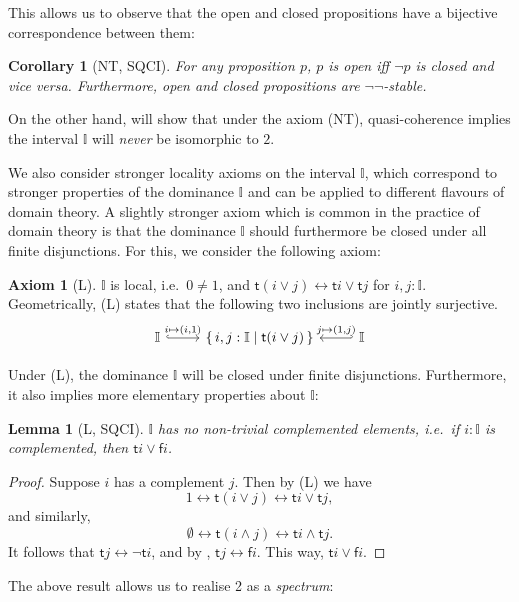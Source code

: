 \documentclass[a4paper,12pt]{amsart}
\newtheorem{lemma}[theorem]{Lemma}
\newtheorem{corollary}[theorem]{Corollary}
\theoremstyle{definition}
\newtheorem*{axiom}{Axiom}
\newcommand{\mbb}[1]{\mathbb{#1}}
\newcommand{\I}{\mbb I}
\newcommand{\ms}[1]{\mathsf{#1}}
\newcommand{\scomp}[2]{\{\,#1\mid#2\,\}}
\newcommand{\dneg}{\neg\neg}
\newcommand{\emp}{\emptyset}
\newcommand{\eq}{\leftrightarrow}
\begin{document}
This allows us to observe that the open and closed propositions have a bijective correspondence between them:

\begin{corollary}[NT, SQCI]\label{cor:opendnegclose}
  For any proposition $p$, $p$ is open iff $\neg p$ is closed and vice versa. Furthermore, open and closed propositions are $\dneg$-stable.
\end{corollary}

On the other hand,  will show that under the axiom (NT), quasi-coherence implies the interval $\I$ will \emph{never} be isomorphic to $2$. 

We also consider stronger locality axioms on the interval $\I$, which correspond to stronger properties of the dominance $\I$ and can be applied to different flavours of domain theory. A slightly stronger axiom which is common in the practice of domain theory is that the dominance $\I$ should furthermore be closed under all finite disjunctions. For this, we consider the following axiom:

\begin{axiom}[L]\label{ax:L}
  $\I$ is local, i.e.\ $0 \neq 1$, and $\ms t(i\vee j) \eq \ms ti \vee \ms tj$ for $i,j : \I$. Geometrically, (L) states that the following two inclusions are jointly surjective.
  \[ 
  \begin{tikzcd}
    \I \ar[r, hook, "{i \mapsto (i,1)}"] & \scomp{i,j : \I}{\ms t(i\vee j)} & \I \ar[l, hook', "{j \mapsto (1,j)}"']
  \end{tikzcd}
  \]
\end{axiom}

Under (L), the dominance $\I$ will be closed under finite disjunctions. Furthermore, it also implies more elementary properties about $\I$:

\begin{lemma}[L, SQCI]\label{lem:intisnotBoolean}
  $\I$ has no non-trivial complemented elements, i.e.\ if $i : \I$ is complemented, then $\ms ti \vee \ms fi$. 
\end{lemma}
\begin{proof}
  Suppose $i$ has a complement $j$. Then by (L) we have
  \[ 1 \eq \ms t(i \vee j) \eq \ms ti \vee \ms tj, \]
  and similarly,
  \[ \emp \eq \ms t(i \wedge j) \eq \ms ti \wedge \ms tj. \]
  It follows that $\ms tj \eq \neg \ms ti$, and by , $\ms tj \eq \ms fi$. This way, $\ms ti \vee \ms fi$.
\end{proof}

The above result allows us to realise 2 as a \emph{spectrum}:
\end{document}
